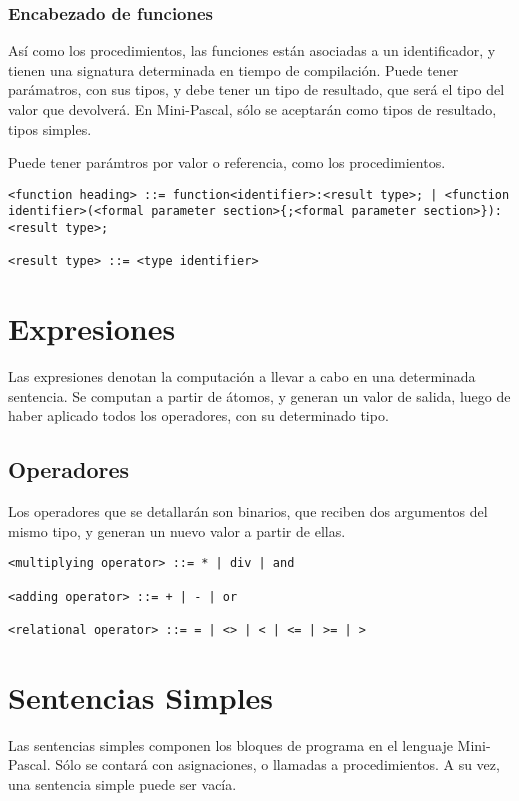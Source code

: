 \documentclass[a4paper,oneside]{report}
\begin{document}
\subsubsection{Encabezado de funciones}

Así como los procedimientos, las funciones están asociadas a un identificador, y tienen una signatura determinada en tiempo de compilación. Puede tener parámatros, con sus tipos, y debe tener un tipo de resultado, que será el tipo del valor que devolverá. En Mini-Pascal, sólo se aceptarán como tipos de resultado, tipos simples.

Puede tener parámtros por valor o referencia, como los procedimientos.

\begin{verbatim}
<function heading> ::= function<identifier>:<result type>; | <function identifier>(<formal parameter section>{;<formal parameter section>}):<result type>;

<result type> ::= <type identifier>
\end{verbatim}

\section{Expresiones}

Las expresiones denotan la computación a llevar a cabo en una determinada sentencia. Se computan a partir de átomos, y generan un valor de salida, luego de haber aplicado todos los operadores, con su determinado tipo.

\subsection{Operadores}

Los operadores que se detallarán son binarios, que reciben dos argumentos del mismo tipo, y generan un nuevo valor a partir de ellas. 

\begin{verbatim}
<multiplying operator> ::= * | div | and

<adding operator> ::= + | - | or

<relational operator> ::= = | <> | < | <= | >= | >
\end{verbatim}


\section{Sentencias Simples}

Las sentencias simples componen los bloques de programa en el lenguaje Mini-Pascal. Sólo se contará con asignaciones, o llamadas a procedimientos. A su vez, una sentencia simple puede ser vacía.
\end{document}

